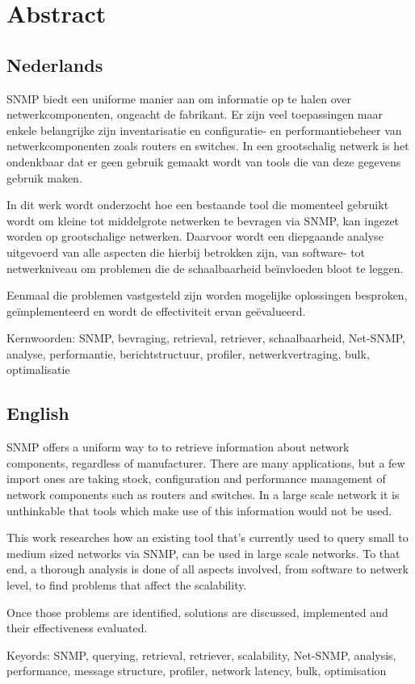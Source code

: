 \chapter*{Abstract}

\section*{Nederlands}

SNMP biedt een uniforme manier aan om informatie op te halen over netwerkcomponenten, ongeacht de fabrikant.
Er zijn veel toepassingen maar enkele belangrijke zijn inventarisatie en configuratie- en performantiebeheer van netwerkcomponenten zoals routers en switches.
In een grootschalig netwerk is het ondenkbaar dat er geen gebruik gemaakt wordt van tools die van deze gegevens gebruik maken.

In dit werk wordt onderzocht hoe een bestaande tool die momenteel gebruikt wordt om kleine tot middelgrote netwerken te bevragen via SNMP,
kan ingezet worden op grootschalige netwerken.
Daarvoor wordt een diepgaande analyse uitgevoerd van alle aspecten die hierbij betrokken zijn,
van software- tot netwerkniveau om problemen die de schaalbaarheid beïnvloeden bloot te leggen.

Eenmaal die problemen vastgesteld zijn worden mogelijke oplossingen besproken, geïmplementeerd en wordt de effectiviteit ervan geëvalueerd.


Kernwoorden: SNMP, bevraging, retrieval, retriever, schaalbaarheid, Net-SNMP, analyse, performantie, berichtstructuur, profiler, netwerkvertraging, bulk, optimalisatie


\section*{English}

SNMP offers a uniform way to to retrieve information about network components, regardless of manufacturer.
There are many applications, but a few import ones are taking stock, configuration and performance management of network components such as routers and switches.
In a large scale network it is unthinkable that tools which make use of this information would not be used.

This work researches how an existing tool that's currently used to query small to medium sized networks via SNMP,
can be used in large scale networks.
To that end, a thorough analysis is done of all aspects involved, from software to netwerk level, to find problems that affect the scalability.

Once those problems are identified, solutions are discussed, implemented and their effectiveness evaluated.


Keyords: SNMP, querying, retrieval, retriever, scalability, Net-SNMP, analysis, performance, message structure, profiler, network latency, bulk, optimisation